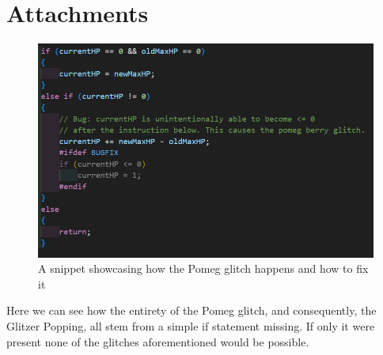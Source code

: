 \documentclass[a4paper]{usiinfbachelorproject}
\begin{document}
\newpage
\section{Attachments}
\FloatBarrier

\begin{figure}[htbp]
	\centering
	\includegraphics[scale=0.6]{figures/pomeg_glitch.png}
	\caption{A snippet showcasing how the Pomeg glitch happens and how to fix it}
	\label{fig:pomeg_glitch_code}
\end{figure}

Here we can see how the entirety of the Pomeg glitch, and consequently, the Glitzer Popping, all stem from a simple if statement missing. If only it were present none of the glitches aforementioned would be possible.
\end{document}
